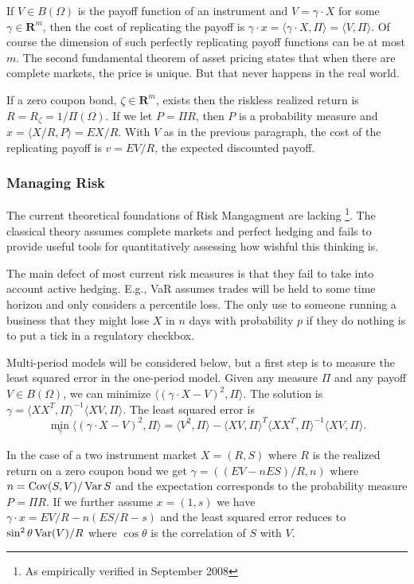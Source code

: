 \documentclass[fleqn]{amsart}
\newcommand{\R}{\mathbf{R}}
\newcommand{\Var}{\mathop{\rm{Var}}}
\newcommand{\Cov}{\mathop{\rm{Cov}}}
\providecommand{\pair}[1]{\langle#1\rangle}
\begin{document}
If $V\in B(\Omega)$ is the payoff function of an instrument and $V =
\gamma\cdot X$ for some $\gamma\in\R^m$, then the cost of replicating the payoff
is $\gamma\cdot x = \langle \gamma\cdot X,\Pi\rangle = \langle V,\Pi\rangle$.
Of course the dimension of such perfectly replicating payoff functions
can be at most $m$. The second fundamental theorem of asset pricing
states that when there are complete markets, the price is unique. But
that never happens in the real world.

If a zero coupon bond, $\zeta\in\R^m$, exists then the riskless realized
return is $R = R_\zeta = 1/\Pi(\Omega)$. If we let $P = \Pi R$, then $P$
is a probability measure and $x = \langle X/R,P\rangle = EX/R$. With
\(V\) as in the previous paragraph, the cost of the replicating payoff 
is \(v = EV/R\), the expected discounted payoff.

\subsubsection{Managing Risk}
The current theoretical foundations of Risk Mangagment are lacking
\footnote{As empirically verified in September 2008}. The
classical theory assumes complete markets and perfect hedging
and fails to provide useful tools for quantitatively assessing how wishful
this thinking is. 

The main defect of most current risk measures is that they fail
to take into account active hedging. E.g., VaR\cite{Jor2006} assumes trades
will be held to some time horizon and only considers a percentile loss.
The only use to someone running a business that they might
lose \(X\) in \(n\) days with probability \(p\) if they do nothing
is to put a tick in a regulatory checkbox.

Multi-period models will be considered below, but a first step
is to measure the least squared error in the one-period model. 
Given any measure \(\Pi\) and any payoff \(V\in B(\Omega)\), we can minimize
\(\pair{(\gamma\cdot X - V)^2, \Pi}\). The solution is
\(\gamma = \pair{XX^T,\Pi}^{-1}\pair{XV,\Pi}\).
The least squared error is 
\[\min_\gamma \pair{(\gamma\cdot X - V)^2, \Pi} 
= \pair{V^2,\Pi} -  \pair{XV,\Pi}^T\pair{XX^T,\Pi}^{-1}\pair{XV,\Pi}.\]

In the case of a two instrument market \(X = (R,S)\) 
where \(R\) is the realized return on a zero coupon bond we get
\(\gamma = ((EV - n ES)/R, n)\) where \(n = \Cov(S,V)/\Var S\) 
and the expectation corresponds to the probability measure
\(P = \Pi R\). If we further assume \(x = (1, s)\) we have
\(\gamma\cdot x = EV/R - n (ES/R - s)\) and
the least squared error reduces to \(\sin^2\theta\Var(V)/R\) where
\(\cos\theta\) is the correlation of \(S\) with \(V\).
\end{document}
